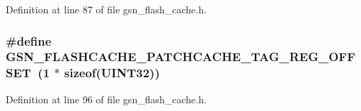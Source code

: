 Definition at line 87 of file gsn\_\-flash\_\-cache.h.

\hypertarget{a00500_aed0d954ce7759195185a61a38f3c313c}{
\subsubsection[{GSN\_\-FLASHCACHE\_\-PATCHCACHE\_\-TAG\_\-REG\_\-OFFSET}]{\setlength{\rightskip}{0pt plus 5cm}\#define GSN\_\-FLASHCACHE\_\-PATCHCACHE\_\-TAG\_\-REG\_\-OFFSET~(1 $\ast$ sizeof({\bf UINT32}))}}
\label{a00500_aed0d954ce7759195185a61a38f3c313c}


Definition at line 96 of file gsn\_\-flash\_\-cache.h.

